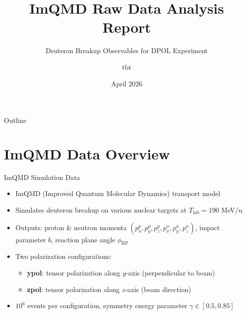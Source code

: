 \documentclass[aspectratio=169,11pt]{beamer}
\title{ImQMD Raw Data Analysis Report}
\subtitle{Deuteron Breakup Observables for DPOL Experiment}
\author{tbt}
\date{April 2026}
\begin{document}
\begin{frame}
\titlepage
\end{frame}

\begin{frame}{Outline}
\tableofcontents
\end{frame}

\section{ImQMD Data Overview}

\begin{frame}{ImQMD Simulation Data}
\begin{itemize}
  \item ImQMD (Improved Quantum Molecular Dynamics) transport model
  \item Simulates deuteron breakup on various nuclear targets at $T_\text{lab} = 190$ MeV/u
  \item Outputs: proton \& neutron momenta $(p_x^p, p_y^p, p_z^p, p_x^n, p_y^n, p_z^n)$, impact parameter $b$, reaction plane angle $\phi_\text{RP}$
  \item Two polarization configurations:
  \begin{itemize}
    \item \textbf{ypol}: tensor polarization along $y$-axis (perpendicular to beam)
    \item \textbf{zpol}: tensor polarization along $z$-axis (beam direction)
  \end{itemize}
  \item $10^6$ events per configuration, symmetry energy parameter $\gamma \in [0.5, 0.85]$
\end{itemize}
\end{frame}
\end{document}
